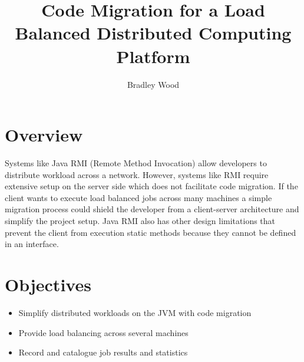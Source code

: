 \documentclass[10pt, oneside,english]{article}
\title{Code Migration for a Load Balanced Distributed Computing Platform}
\author[1]{Bradley Wood}
\affil[ ]{University of Ontario Institute of Technology}
\date{}
\begin{document}
    \maketitle

    \section{Overview}\label{sec:overview}

    Systems like Java RMI (Remote Method Invocation) allow developers to distribute
    workload across a network.
    However, systems like RMI require extensive setup on the server side which does
    not facilitate code migration.
    If the client wants to execute load balanced jobs across many machines
    a simple migration process could shield the developer from a client-server
    architecture and simplify the project setup.
    Java RMI also has other design limitations that prevent the client from execution static
    methods because they cannot be defined in an interface.

    \section{Objectives}\label{sec:objectives}

    \begin{itemize}
        \item Simplify distributed workloads on the JVM with code migration
        \item Provide load balancing across several machines
        \item Record and catalogue job results and statistics
    \end{itemize}
\end{document}
